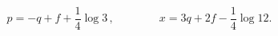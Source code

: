 \begin{equation}
p= -q+f +\frac{1}{4} \log 3 \, , \qquad \qquad x = 3 q + 2 f -\frac{1}{4} \log 12.
\end{equation}

